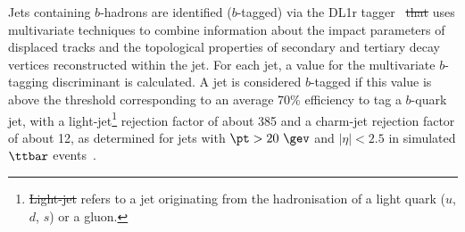 \documentclass[PAPER, coverpage, atlasdraft=true, texlive=2016, UKenglish]{\ATLASLATEXPATH atlasdoc}
\providecommand{\DIFadd}[1]{{\protect\color{blue}\uwave{#1}}} %
\providecommand{\DIFdel}[1]{{\protect\color{red}\sout{#1}}}                      %
\providecommand{\DIFaddbegin}{} %
\providecommand{\DIFaddend}{} %
\providecommand{\DIFdelbegin}{} %
\providecommand{\DIFdelend}{} %
\begin{document}
Jets containing $b$-hadrons are identified ($b$-tagged) via the DL1r tagger~\cite{Aad:2019epj79,ATL-PHYS-PUB-2017-013}\DIFaddbegin \DIFadd{, }\DIFaddend %
\DIFdelbegin \DIFdel{that }\DIFdelend \DIFaddbegin \DIFadd{which }\DIFaddend uses multivariate techniques to combine information about the impact parameters of displaced tracks and the  topological properties 
of secondary and tertiary decay vertices reconstructed within the jet. For each jet, a value for the multivariate $b$-tagging discriminant is 
calculated. A jet is considered $b$-tagged if this value is above the threshold corresponding to
an average 70\% efficiency to tag a $b$-quark jet, with a light-jet\footnote{\DIFdelbegin \DIFdel{Light-jet }\DIFdelend \DIFaddbegin \DIFadd{A `light jet' }\DIFaddend refers to a jet originating from the hadronisation of a light quark ($u$, $d$, $s$) or a gluon.} rejection factor of about 385 and a charm-jet rejection factor of about 12, as determined for jets with
$\pt >20~\gev$ and $|\eta|<2.5$ in simulated $\ttbar$ events~\cite{Aad:2019epj79}.
\end{document}
